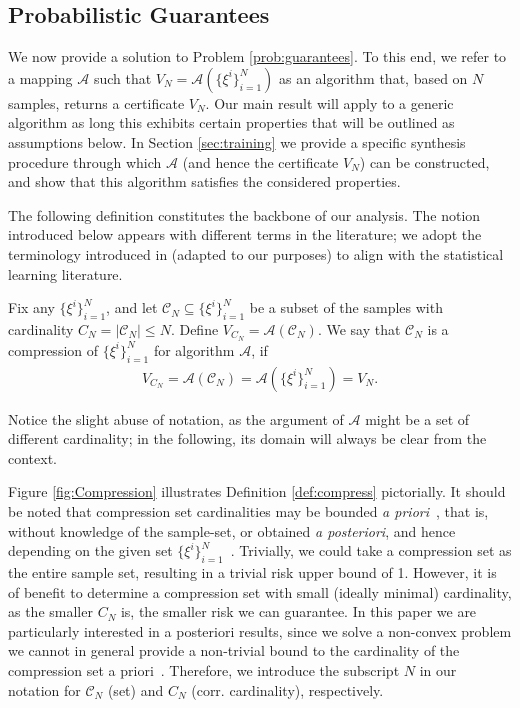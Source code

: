 \subsection{Probabilistic Guarantees}

We now provide a solution to Problem \ref{prob:guarantees}. 
To this end, we refer to a mapping $\mathcal{A}$ such that $V_N = \mathcal{A}(\{\xi^i\}_{i=1}^{N})$ as an algorithm that, based on $N$ samples, returns a certificate $V_N$. Our main result will apply to a generic algorithm as long this exhibits certain properties that will be outlined as assumptions below. In Section \ref{sec:training} we provide a specific synthesis procedure through which $\mathcal{A}$ (and hence the certificate $V_N$) can be constructed, and show that this algorithm satisfies the considered properties.

The following definition constitutes the backbone of our analysis. The notion introduced below appears with different terms in the literature; we adopt the terminology introduced in \cite{DBLP:journals/jmlr/CampiG23,DBLP:journals/tac/MargellosPL15} (adapted to our purposes) to align with the statistical learning literature. 



\begin{defn}\label{def:compress}
Fix any $\{\xi^i\}_{i=1}^{N}$, and let $\mathcal{C}_N \subseteq \{\xi^i\}_{i=1}^{N}$ be a subset of the samples with cardinality $C_N = |\mathcal{C}_N| \leq N$.
Define $V_{C_N} = \mathcal{A}(\mathcal{C}_N)$.
We say that $\mathcal{C}_N$ is a compression of $\{\xi^i\}_{i=1}^{N}$ for algorithm $\mathcal{A}$, if
    \begin{equation}
    \begin{aligned}
		V_{C_N} = \mathcal{A}(\mathcal{C}_N) = \mathcal{A}(\{\xi^i\}_{i=1}^{N}) = V_N.
    \end{aligned}
    \end{equation}
\end{defn}
Notice the slight abuse of notation, as the argument of $\mathcal{A}$ might be a set of different cardinality; in the following, its domain will always be clear from the context. 

Figure \ref{fig:Compression} illustrates Definition \ref{def:compress} pictorially. 
It should be noted that compression set cardinalities may be bounded \emph{a priori}~\cite{DBLP:journals/siamjo/CampiG08}, that is, without knowledge of the sample-set, or obtained \emph{a posteriori}, and hence depending on the given set $\{\xi^i\}_{i=1}^{N}$~\cite{DBLP:journals/mp/CampiG18}. 
Trivially, we could take a compression set as the entire sample set, resulting in a trivial risk upper bound of 1. 
    However, it is of benefit to determine a compression set with small (ideally minimal) cardinality, as the smaller $C_N$ is, the smaller risk we can guarantee. 
In this paper we are particularly interested in a posteriori results, since we solve a non-convex problem we cannot in general provide a non-trivial bound to the cardinality of the compression set a priori~\cite{DBLP:journals/tac/CampiGR18}.
Therefore, we introduce the subscript $N$ in our notation for $\mathcal{C}_N$ (set) and $C_N$ (corr. cardinality), respectively.

